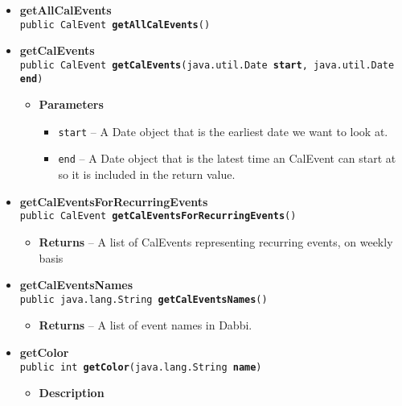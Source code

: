 \documentclass[11pt,a4paper]{report}
\begin{document}
{{{\begin{itemize}
{\begin{itemize}
{Deletes all the events in the events table of the database.
}
\end{itemize}
}%
\item{ 
{\bf  getAllCalEvents}\\
\texttt{public CalEvent\lbrack \rbrack \ {\bf  getAllCalEvents}()
\label{is.mpg.ruglan.data.Dabbi.getAllCalEvents()}}%
}%
\item{ 
{\bf  getCalEvents}\\
\texttt{public CalEvent\lbrack \rbrack \ {\bf  getCalEvents}(\texttt{java.util.Date} {\bf  start},
\texttt{java.util.Date} {\bf  end})
\label{is.mpg.ruglan.data.Dabbi.getCalEvents(java.util.Date, java.util.Date)}}%
\begin{itemize}
\item{
{\bf  Parameters}
  \begin{itemize}
   \item{
\texttt{start} -- A Date object that is the earliest date we want to look at.}
   \item{
\texttt{end} -- A Date object that is the latest time an CalEvent can start at so it is included in the return value.}
  \end{itemize}
}%
\end{itemize}
}%
\item{ 
{\bf  getCalEventsForRecurringEvents}\\
\texttt{public CalEvent\lbrack \rbrack \ {\bf  getCalEventsForRecurringEvents}()
\label{is.mpg.ruglan.data.Dabbi.getCalEventsForRecurringEvents()}}%
\begin{itemize}
\item{{\bf  Returns} -- 
A list of CalEvents representing recurring events, on weekly basis 
}%
\end{itemize}
}%
\item{ 
{\bf  getCalEventsNames}\\
\texttt{public java.lang.String\lbrack \rbrack \ {\bf  getCalEventsNames}()
\label{is.mpg.ruglan.data.Dabbi.getCalEventsNames()}}%
\begin{itemize}
\item{{\bf  Returns} -- 
A list of event names in Dabbi. 
}%
\end{itemize}
}%
\item{ 
{\bf  getColor}\\
\texttt{public int\ {\bf  getColor}(\texttt{java.lang.String} {\bf  name})
\label{is.mpg.ruglan.data.Dabbi.getColor(java.lang.String)}}%
\begin{itemize}
\item{
{\bf  Description}

}
\end{itemize}}
\end{itemize}}}}
\end{document}
